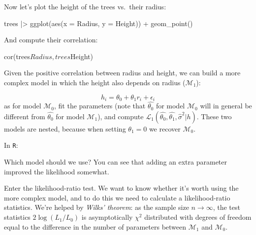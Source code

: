 \documentclass[
  letterpaper,
  DIV=11,
  numbers=noendperiod]{scrreprt}
\newenvironment{Shaded}{\begin{snugshade}}{\end{snugshade}}
\newcommand{\NormalTok}[1]{\textcolor[rgb]{0.00,0.23,0.31}{#1}}
\begin{document}
Now let's plot the height of the trees vs.~their radius:

\begin{Shaded}
\begin{Highlighting}[]
\NormalTok{trees |\textgreater{} ggplot(aes(x = Radius, y = Height)) + }
\NormalTok{  geom\_point()}
\end{Highlighting}
\end{Shaded}

And compute their correlation:

\begin{Shaded}
\begin{Highlighting}[]
\NormalTok{cor(trees$Radius, trees$Height)}
\end{Highlighting}
\end{Shaded}

Given the positive correlation between radius and height, we can build a
more complex model in which the height also depends on radius
(\(\mathcal M_1\)):

\[
h_i = \theta_0 + \theta_1 r_i + \epsilon_i
\] as for model \(\mathcal M_0\), fit the parameters (note that
\(\hat{\theta_0}\) for model \(\mathcal M_0\) will in general be
different from \(\hat{\theta_0}\) for model \(\mathcal M_1\)), and
compute
\(\mathcal L_1(\hat{\theta_0},\hat{\theta_1},\hat{\sigma}^2 \vert h)\).
These two models are nested, because when setting \(\theta_1 = 0\) we
recover \(\mathcal M_0\).

In \texttt{R}:

\begin{Shaded}
\end{Shaded}

Which model should we use? You can see that adding an extra parameter
improved the likelihood somewhat.

Enter the likelihood-ratio test. We want to know whether it's worth
using the more complex model, and to do this we need to calculate a
likelihood-ratio statistics. We're helped by \emph{Wilks' theorem}: as
the sample size \(n \to \infty\), the test statistics
\(2 \log(L_1 / L_0)\) is asymptotically \(\chi^2\) distributed with
degrees of freedom equal to the difference in the number of parameters
between \(\mathcal M_1\) and \(\mathcal M_0\).
\end{document}
